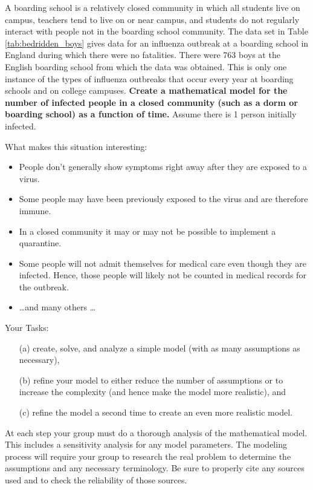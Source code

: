 \begin{problem}
A boarding school is a relatively closed community in which all students live on campus,
teachers tend to live on or near campus, and students do not regularly interact with
people not in the boarding school community. The data set in Table
\ref{tab:bedridden_boys} gives data for an influenza
outbreak at a boarding school in England during which there were no fatalities. There were
763 boys at the English boarding school from which the data was obtained. This is only one
instance of the types of influenza outbreaks that occur every year at boarding schools and
on college campuses.  {\bf Create a mathematical model for the number of infected people
    in a closed community (such as a dorm or boarding school) as a function of time.}
    Assume there is 1 person initially infected.

What makes this situation interesting:
\begin{itemize}
    \item People don't generally show symptoms right away after they are exposed to a virus.
    \item Some people may have been previously exposed to the virus and are therefore
        immune.
    \item In a closed community it may or may not be possible to implement a quarantine.
    \item Some people will not admit themselves for medical care even though they are
        infected.  Hence, those people will likely not be counted in medical records for
        the outbreak.
    \item \ldots and many others \ldots
\end{itemize}
Your Tasks:
\begin{itemize}
    \item[(a)]create, solve, and analyze a simple model (with as many assumptions as
        necessary),
    \item[(b)] refine your model to either reduce the number of assumptions or to increase the
        complexity (and hence make the model more realistic), and
    \item[(c)] refine the model a second time to create an even more realistic model.
\end{itemize}
At each step your group must do a thorough analysis of the mathematical model.  This
includes a sensitivity analysis for any model parameters. The modeling process will
require your group to research the real problem to determine the assumptions and any
necessary terminology. Be sure to properly cite any sources used and to check the
reliability of those sources.
\end{problem}

